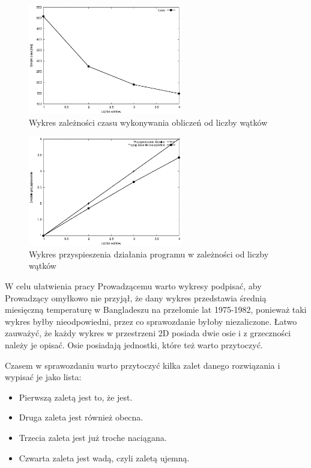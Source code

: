 \documentclass[a4paper,12pt]{article}
\newenvironment{lista}{
\begin{itemize}
  \setlength{\itemsep}{1pt}
  \setlength{\parskip}{0pt}
  \setlength{\parsep}{0pt}
}{\end{itemize}}
\begin{document}
\begin{figure}[!h]
	\centering
  \includegraphics[width=0.6\textwidth]{dane/wykresCzas.eps}
  \caption{Wykres zależności czasu wykonywania obliczeń od liczby wątków}
\end{figure}

\begin{figure}[!h]
	\centering
  \includegraphics[width=0.6\textwidth]{dane/wykresPrzyspieszenie.eps}
  \caption{Wykres przyspieszenia działania programu w zależności od liczby wątków}
\end{figure}

W celu ułatwienia pracy Prowadzącemu warto wykresy podpisać, aby Prowadzący omyłkowo nie przyjął, że dany wykres przedstawia średnią miesięczną temperaturę w Bangladeszu na przełomie lat 1975-1982, ponieważ taki wykres byłby nieodpowiedni, przez co sprawozdanie byłoby niezaliczone. Łatwo zauważyć, że każdy wykres w przestrzeni 2D posiada dwie osie i z grzeczności należy je opisać. Osie posiadają jednostki, które też warto przytoczyć.

Czasem w sprawozdaniu warto przytoczyć kilka zalet danego rozwiązania i wypisać je jako lista:
\begin{lista}
 \item Pierwszą zaletą jest to, że jest.
 \item Druga zaleta jest również obecna.
 \item Trzecia zaleta jest już troche naciągana.
 \item Czwarta zaleta jest wadą, czyli zaletą ujemną.
\end{lista}
\end{document}
